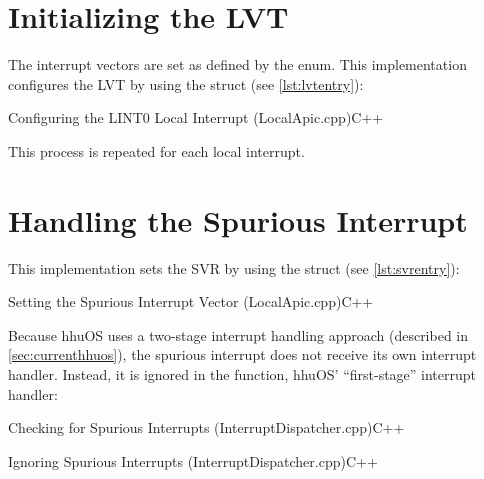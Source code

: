 \section{Initializing the LVT}
\label{sec:apxlvtinit}

The interrupt vectors are set as defined by the  enum. This implementation
configures the LVT by using the  struct (see \autoref{lst:lvtentry}):

\begin{codeblock}{Configuring the LINT0 Local Interrupt (LocalApic.cpp)}{C++}
\end{codeblock}

This process is repeated for each local interrupt.


\section{Handling the Spurious Interrupt}
\label{sec:apxsvr}

This implementation sets the SVR by using the  struct (see \autoref{lst:svrentry}):

\begin{codeblock}{Setting the Spurious Interrupt Vector (LocalApic.cpp)}{C++}
\end{codeblock}

Because hhuOS uses a two-stage interrupt handling approach (described in
\autoref{sec:currenthhuos}), the spurious interrupt does not receive its own interrupt handler.
Instead, it is ignored in the  function, hhuOS' ``first-stage'' interrupt handler:

\begin{codeblock}{Checking for Spurious Interrupts (InterruptDispatcher.cpp)}{C++}
\end{codeblock}

\begin{codeblock}{Ignoring Spurious Interrupts (InterruptDispatcher.cpp)}{C++}
\end{codeblock}


